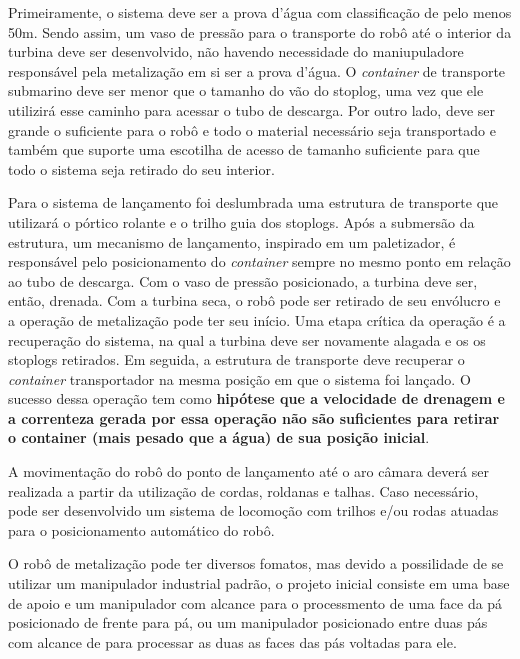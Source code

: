 Primeiramente, o sistema deve ser a prova d'água com classificação de pelo
menos 50m.
Sendo assim, um vaso de pressão para o transporte do robô até o interior da turbina deve ser
desenvolvido, não havendo necessidade do maniupuladore responsável pela
metalização em si ser a prova d'água. O \textit{container} de transporte
submarino deve ser menor que o tamanho do vão do stoplog, uma vez que ele
utilizirá esse caminho para acessar o tubo de descarga. Por outro lado, deve ser
grande o suficiente para o robô e todo o material necessário seja transportado e
também que suporte uma escotilha de acesso de tamanho suficiente para que todo o
sistema seja retirado do seu interior.

Para o sistema de lançamento foi deslumbrada uma estrutura de transporte que
utilizará o pórtico rolante e o trilho guia dos stoplogs. Após a submersão da
estrutura, um mecanismo de lançamento, inspirado em um paletizador, é
responsável pelo posicionamento do \textit{container} sempre no mesmo ponto em
relação ao tubo de descarga. Com o vaso de pressão posicionado, a turbina deve
ser, então, drenada. Com a turbina seca, o robô pode ser retirado de seu
envólucro e a operação de metalização pode ter seu início. Uma etapa crítica da
operação é a recuperação do sistema, na qual a turbina deve ser novamente
alagada e os os stoplogs retirados. Em seguida, a estrutura de transporte deve
recuperar o \textit{container} transportador na mesma posição em que o sistema
foi lançado. O sucesso dessa operação tem como \textbf{hipótese que a velocidade
de drenagem e a correnteza gerada por essa operação não são suficientes para
retirar o container (mais pesado que a água) de sua posição inicial}. 

A movimentação do robô do ponto de lançamento até o aro câmara deverá ser
realizada a partir da utilização de cordas, roldanas e talhas. Caso necessário,
pode ser desenvolvido um sistema de locomoção com trilhos e/ou rodas atuadas
para o posicionamento automático do robô.

O robô de metalização pode ter diversos fomatos, mas devido a possilidade de se
utilizar um manipulador industrial padrão, o projeto inicial consiste em uma
base de apoio e um manipulador com alcance para o processmento de uma face da pá
posicionado de frente para pá, ou um manipulador posicionado entre duas pás com
alcance de para processar as duas as faces das pás voltadas para ele.




